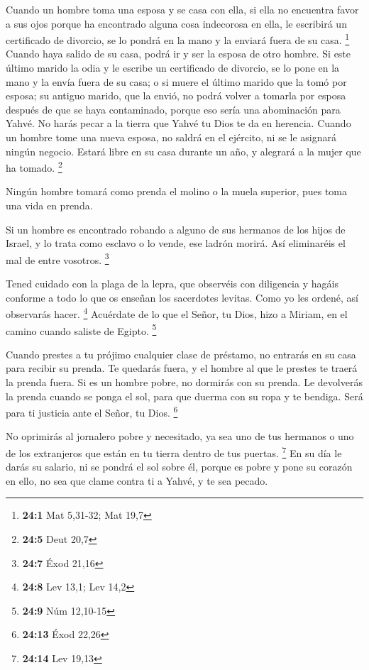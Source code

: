 \begin{paracol}{2}
 Cuando un hombre toma una esposa y se casa con ella, si
ella no encuentra favor a sus ojos porque ha encontrado alguna cosa
indecorosa en ella, le escribirá un certificado de divorcio, se lo
pondrá en la mano y la enviará fuera de su casa. \footnote{\textbf{24:1}
  Mat 5,31-32; Mat 19,7}  Cuando haya salido de su casa,
podrá ir y ser la esposa de otro hombre.  Si este último
marido la odia y le escribe un certificado de divorcio, se lo pone en la
mano y la envía fuera de su casa; o si muere el último marido que la
tomó por esposa;  su antiguo marido, que la envió, no
podrá volver a tomarla por esposa después de que se haya contaminado,
porque eso sería una abominación para Yahvé. No harás pecar a la tierra
que Yahvé tu Dios te da en herencia.  Cuando un hombre
tome una nueva esposa, no saldrá en el ejército, ni se le asignará
ningún negocio. Estará libre en su casa durante un año, y alegrará a la
mujer que ha tomado. \footnote{\textbf{24:5} Deut 20,7}

 Ningún hombre tomará como prenda el molino o la muela
superior, pues toma una vida en prenda.

 Si un hombre es encontrado robando a alguno de sus
hermanos de los hijos de Israel, y lo trata como esclavo o lo vende, ese
ladrón morirá. Así eliminaréis el mal de entre vosotros. \footnote{\textbf{24:7}
  Éxod 21,16}

 Tened cuidado con la plaga de la lepra, que observéis con
diligencia y hagáis conforme a todo lo que os enseñan los sacerdotes
levitas. Como yo les ordené, así observarás hacer. \footnote{\textbf{24:8}
  Lev 13,1; Lev 14,2}  Acuérdate de lo que el Señor, tu
Dios, hizo a Miriam, en el camino cuando saliste de Egipto. \footnote{\textbf{24:9}
  Núm 12,10-15}

 Cuando prestes a tu prójimo cualquier clase de préstamo,
no entrarás en su casa para recibir su prenda.  Te
quedarás fuera, y el hombre al que le prestes te traerá la prenda fuera.
 Si es un hombre pobre, no dormirás con su prenda.
 Le devolverás la prenda cuando se ponga el sol, para que
duerma con su ropa y te bendiga. Será para ti justicia ante el Señor, tu
Dios. \footnote{\textbf{24:13} Éxod 22,26}

 No oprimirás al jornalero pobre y necesitado, ya sea uno
de tus hermanos o uno de los extranjeros que están en tu tierra dentro
de tus puertas. \footnote{\textbf{24:14} Lev 19,13}  En
su día le darás su salario, ni se pondrá el sol sobre él, porque es
pobre y pone su corazón en ello, no sea que clame contra ti a Yahvé, y
te sea pecado.


\end{paracol}
